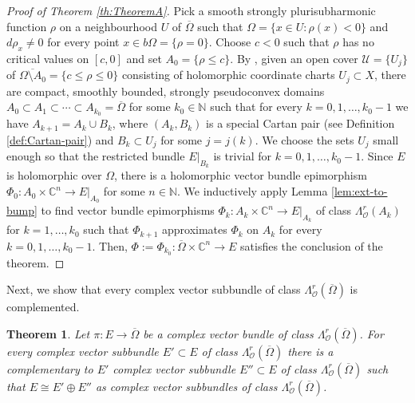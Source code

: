 \documentclass[11pt]{amsart}
\numberwithin{equation}{section}
\newtheorem{theorem}{Theorem}[section]
\theoremstyle{definition}
\newcommand\Ucal{\mathcal{U}}
\newcommand\Oscr{\mathscr{O}}
\newcommand\C{\mathbb{C}}
\newcommand\N{\mathbb{N}}
\begin{document}
\begin{proof}[Proof of Theorem \ref{th:TheoremA}]
Pick a smooth strongly plurisubharmonic function $\rho$ on a 
neighbourhood $U$ of $\overline\Omega$
such that $\Omega=\{x\in U:\rho(x)<0\}$ and $d\rho_x\ne 0$
for every point $x\in b\Omega =\{\rho=0\}$. Choose $c<0$ such that
$\rho$ has no critical values on $[c,0]$ and 
set $A_0=\{\rho\le c\}$. By \cite[Lemma 5.10.3]{Forstneric2017E}, 
given an open cover $\Ucal=\{U_j\}$ of 
$\overline{\Omega\setminus A_0}=\{c\le \rho\le 0\}$ consisting of
holomorphic coordinate charts $U_j\subset X$,   
there are compact, smoothly bounded, strongly pseudoconvex domains 
$A_0\subset A_1 \subset \cdots \subset A_{k_0}=\overline\Omega$
for some $k_0\in\N$ such that for every $k=0,1,\ldots,k_0-1$ we have 
$A_{k+1}=A_k\cup B_k$, where $(A_k,B_k)$ is a special Cartan pair
(see Definition \ref{def:Cartan-pair}) and $B_k\subset U_j$
for some $j=j(k)$. We choose the sets $U_j$ small enough so that 
the restricted bundle $E|_{B_k}$ is trivial for $k=0,1,\ldots,k_0-1$.
Since $E$ is holomorphic over $\Omega$,
there is a holomorphic vector bundle epimorphism
$\Phi_0:A_0\times \C^n \to E|_{A_0}$ for some $n\in \N$. 
We inductively apply Lemma \ref{lem:ext-to-bump}
to find vector bundle epimorphisms
$\Phi_k:A_k\times \C^n \to E|_{A_k}$ of class $\Lambda^r_\Oscr(A_k)$
for $k=1,\ldots,k_0$ such that $\Phi_{k+1}$ approximates $\Phi_k$ 
on $A_k$ for every $k=0,1,\ldots,k_0-1$.
Then, $\Phi:=\Phi_{k_0}:\overline \Omega \times \C^n\to E$ 
satisfies the conclusion of the theorem.
\end{proof}

Next, we show that every complex vector subbundle 
of class $\Lambda^r_\Oscr(\overline\Omega)$ is complemented.

%
%
\begin{theorem}\label{th:complement}
Let $\pi:E\to \overline\Omega$ be a complex vector bundle of class
$\Lambda^r_\Oscr(\overline\Omega)$. For every 
complex vector subbundle $E'\subset E$ of class 
$\Lambda^r_\Oscr(\overline\Omega)$ there is a complementary 
to $E'$ complex vector subbundle $E''\subset E$ of class 
$\Lambda^r_\Oscr(\overline\Omega)$ such that $E\cong E'\oplus E''$
as complex vector subbundles of class $\Lambda^r_\Oscr(\overline\Omega)$.
\end{theorem}
\end{document}
